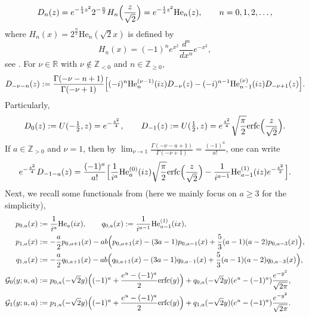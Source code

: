 \documentclass[reqno]{amsart}
\newcommand{\1}{\mathds{1}}
\newcommand{\R}{\mathds{R}}
\numberwithin{equation}{section}
\theoremstyle{definition}
\begin{document}
\begin{equation}
    D_{n}(z)=e^{-\frac{1}{4}z^2}2^{-\frac{n}{2}}H_n\Bigl(\frac{z}{\sqrt{2}}\Bigr)
    =e^{-\frac{1}{4}z^2}\mathrm{He}_n(z), \qquad n=0,1,2,\dots,
\end{equation}
where $H_n(x)=2^{\frac{n}{2}}\mathrm{He}_n(\sqrt{2}x)$ is defined by 
\[
H_n(x)=(-1)^ne^{x^2}\frac{d^n}{dx^n}e^{-x^2},
\]
see \cite[Eq. (18.5.5)]{NIST}.
For $\nu\in\R$ with $\nu\notin\mathbb{Z}_{<0}$ and $n\in\mathbb{Z}_{\geq 0}$, 
\begin{equation}
D_{-\nu-n}(z):=\frac{\Gamma(-\nu-n+1)}{\Gamma(-\nu+1)}
\Bigl[
(-i)^n\mathrm{He}_{n}^{(\nu-1)}(iz)D_{-\nu}(z)-(-i)^{n-1}\mathrm{He}_{n-1}^{(\nu)}(iz)D_{-\nu+1}(z)
\Bigr].
\end{equation}
Particularly, 
\begin{equation}
\label{def of D0 Dminus1}
D_0(z):=U(-\tfrac{1}{2},z)=e^{-\frac{z^2}{4}},\qquad
D_{-1}(z):=U(\tfrac{1}{2},z)=e^{\frac{z^2}{4}}\sqrt{\frac{\pi}{2}}\mathrm{erfc}\Bigl(\frac{z}{\sqrt{2}}\Bigr). 
\end{equation}
If $a\in\mathbb{Z}_{>0}$ and $\nu=1$, then by $\lim_{\nu\to1}\frac{\Gamma(-\nu-a+1)}{\Gamma(-\nu+1)}=\frac{(-1)^a}{a!}$, one can write 
\[
e^{-\frac{z^2}{4}}D_{-1-a}(z)
=\frac{(-1)^a}{a!}
\Bigl[
\frac{1}{i^{a}}\mathrm{He}_{a}^{(0)}(iz)\sqrt{\frac{\pi}{2}}\mathrm{erfc}\Bigl(\frac{z}{\sqrt{2}}\Bigr)
-\frac{1}{i^{a-1}}\mathrm{He}_{a-1}^{(1)}(iz)e^{-\frac{z^2}{2}}
\Bigr].
\]
Next, we recall some functionals from \cite[Eqs. (1.8), (1.9), (1.10), (1.11), (1.13), and (1.14)]{BC2022} (here we mainly focus on $a\geq 3$ for the simplicity), 
\begin{align*}
    p_{0,a}(x)&:=\frac{1}{i^a} \mathrm{He}_{a}(ix), \qquad  q_{0,a}(x):=\frac{1}{i^{a-1}}\mathrm{He}_{a-1}^{(1)}(ix), \\
    p_{1,a}(x)&:=-\frac{a}{2}p_{0,a+1}(x)-ab \Bigl(p_{0,a+1}(x)-(3a-1)p_{0,a-1}(x)+\frac{5}{3}(a-1)(a-2)p_{0,a-3}(x)\Bigr),
    \\
    q_{1,a}(x)&:=-\frac{a}{2}q_{0,a+1}(x)-ab \Bigl(q_{0,a+1}(x)-(3a-1)q_{0,a-1}(x)+\frac{5}{3}(a-1)(a-2)q_{0,a-3}(x)\Bigr), 
    \\
    \mathcal{G}_{0}(y;u,a)&:=p_{0,a}(-\sqrt{2}y)\Bigl((-1)^a+\frac{e^u-(-1)^a}{2}\mathrm{erfc}(y)\Bigr)+q_{0,a}(-\sqrt{2}y)(e^u-(-1)^a)\frac{e^{-y^2}}{\sqrt{2\pi}}, 
    \\
    \mathcal{G}_{1}(y;u,a)&:=p_{1,a}(-\sqrt{2}y)\Bigl((-1)^{a}+\frac{e^u-(-1)^a}{2}\mathrm{erfc}(y)\Bigr)
    +q_{1,a}(-\sqrt{2}y)(e^{u}-(-1)^{a})\frac{e^{-y^2}}{\sqrt{2\pi}}. 
\end{align*}
\end{document}
